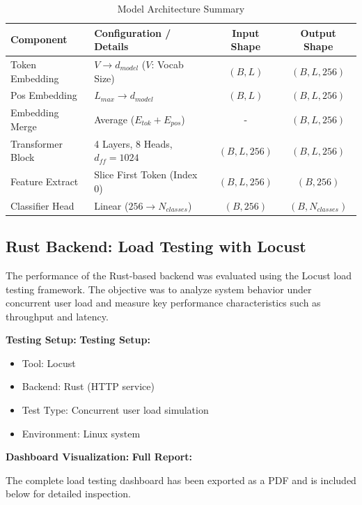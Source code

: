 \documentclass{ieeeaccess}
\begin{document}
\begin{table}[t!]
\centering
\caption{Model Architecture Summary}
\label{tab:model_arch}
\begin{tabular}{|l|l|c|c|}
\hline
\textbf{Component} & \textbf{Configuration / Details} & \textbf{Input Shape} & \textbf{Output Shape} \\ \hline
Token Embedding & $V \to d_{model}$ ($V$: Vocab Size) & $(B, L)$ & $(B, L, 256)$ \\ \hline
Pos Embedding & $L_{max} \to d_{model}$ & $(B, L)$ & $(B, L, 256)$ \\ \hline
Embedding Merge & Average ($E_{tok} + E_{pos}$) & - & $(B, L, 256)$ \\ \hline
Transformer Block & 4 Layers, 8 Heads, $d_{ff}=1024$ & $(B, L, 256)$ & $(B, L, 256)$ \\ \hline
Feature Extract & Slice First Token (Index 0) & $(B, L, 256)$ & $(B, 256)$ \\ \hline
Classifier Head & Linear ($256 \to N_{classes}$) & $(B, 256)$ & $(B, N_{classes})$ \\ \hline
\end{tabular}
\end{table}



\subsection{Rust Backend: Load Testing with Locust}

The performance of the Rust-based backend was evaluated using the Locust load testing framework. The objective was to analyze system behavior under concurrent user load and measure key performance characteristics such as throughput and latency.

\textbf{Testing Setup:}
\textbf{Testing Setup:}
\begin{itemize}
    \item Tool: Locust
    \item Backend: Rust (HTTP service)
    \item Test Type: Concurrent user load simulation
    \item Environment: Linux system
\end{itemize}

\textbf{Dashboard Visualization:}
\textbf{Full Report:}

The complete load testing dashboard has been exported as a PDF and is included below for detailed inspection.
\end{document}
